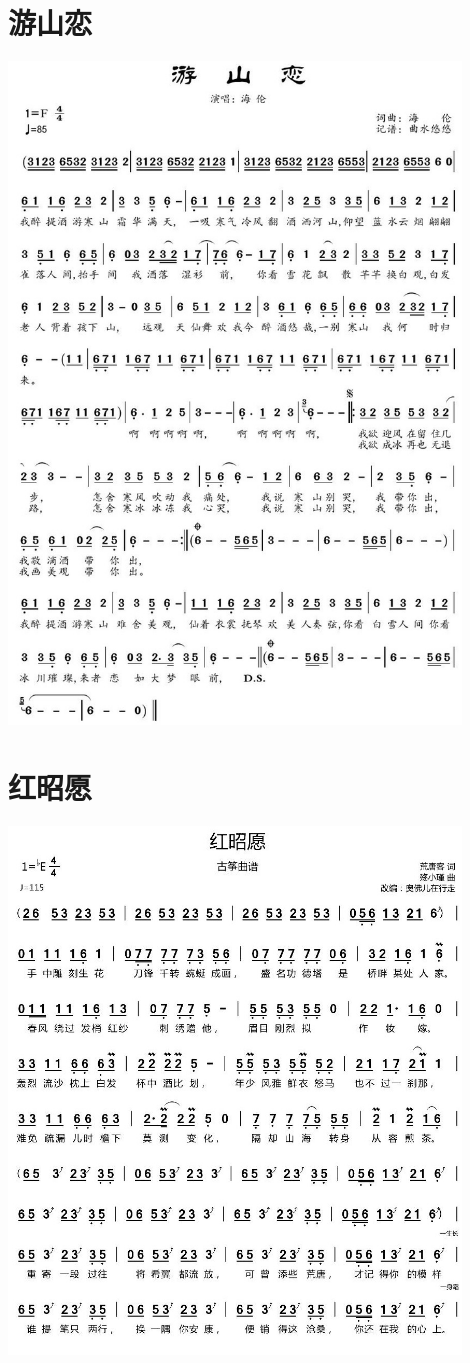 \documentclass[cn,pad,twocol]{elegantbook}
\begin{document}
\section{游山恋} \includegraphics[width=0.9\textwidth]{macos/2020游山恋.jpg}
\section{红昭愿} \includegraphics[width=0.9\textwidth]{macos/2020红昭愿.jpg}
\end{document}
